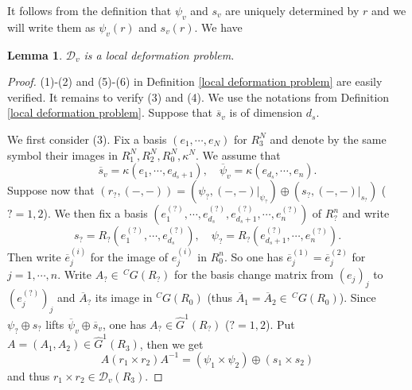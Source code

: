 \documentclass[12pt,oneside,reqno]{amsart}
\theoremstyle{plain}
\newtheorem{lemma}[theorem]{Lemma}
\begin{document}
	
	It follows from the definition that
	$\psi_v$ and
	$s_v$
	are uniquely determined by
	$r$
	and we will write them as
	$\psi_v(r)$ and $s_v(r)$.
	We have
	\begin{lemma}\label{Taylor-Wiles deformations a la Thorne}
		$\mathcal{D}_v$
		is a local deformation problem.
	\end{lemma}
	\begin{proof}
		(1)-(2) and (5)-(6) in 
		Definition
		\ref{local deformation problem}
		are easily verified. It remains to verify (3) and (4).		
		We use the notations from
		Definition
		\ref{local deformation problem}.
		Suppose that
		$\overline{s}_v$
		is of dimension $d_s$.
		
		
		
		
		We first consider (3).
		Fix a basis
		$(e_1,\cdots,e_N)$
		for
		$R_3^N$
		and 
		denote by the same symbol their images in
		$R_1^N,R_2^N,R_0^N,\kappa^N$.
		We assume that
		\[
		\overline{s}_v
		=
		\kappa(e_1,\cdots,e_{d_s+1}),
		\quad
		\overline{\psi}_v
		=
		\kappa(e_{d_s},\cdots,e_n).
		\]
		Suppose now that
		$(r_?,(-,-))=(\psi_?,(-,-)|_{\psi_?})\oplus(s_?,(-,-)|_{s_?})$ ($?=1,2$).
		We then fix a basis
		$(e_1^{(?)},\cdots,e_{d_s}^{(?)},
		e_{d_s+1}^{(?)},\cdots,e_n^{(?)})$
		of
		$R_?^n$
		and write
		\[
		s_?=R_?(e_1^{(?)},\cdots,e_{d_s}^{(?)}),
		\quad
		\psi_?=R_?(e_{d_s+1}^{(?)},\cdots,e_n^{(?)}).
		\]
		Then
		write
		$\overline{e}_j^{(i)}$
		for the image of
		$e_j^{(i)}$
		in
		$R_0^n$.
		So one has
		$\overline{e}_j^{(1)}=\overline{e}_j^{(2)}$
		for $j=1,\cdots,n$.
		Write
		$A_?\in\,^CG(R_?)$
		for the basis change matrix from
		$(e_j)_j$
		to
		$(e_j^{(?)})_j$
		and
		$\overline{A}_?$
		its image in
		$^CG(R_0)$
		(thus
		$\overline{A}_1=\overline{A}_2
		\in
		\,^CG(R_0)$).
		Since
		$\psi_?\oplus s_?$
		lifts
		$\overline{\psi}_v\oplus\overline{s}_v$,
		one has
		$A_?\in\widehat{G}^1(R_?)$
		($?=1,2$).
		Put
		$A=(A_1,A_2)
		\in\widehat{G}^1(R_3)$,
		then we get
		\[
		A(r_1\times r_2)A^{-1}=(\psi_1\times\psi_2)\oplus(s_1\times s_2)
		\]
		and thus
		$r_1\times r_2\in\mathcal{D}_v(R_3)$.
		

\end{proof}
\end{document}
